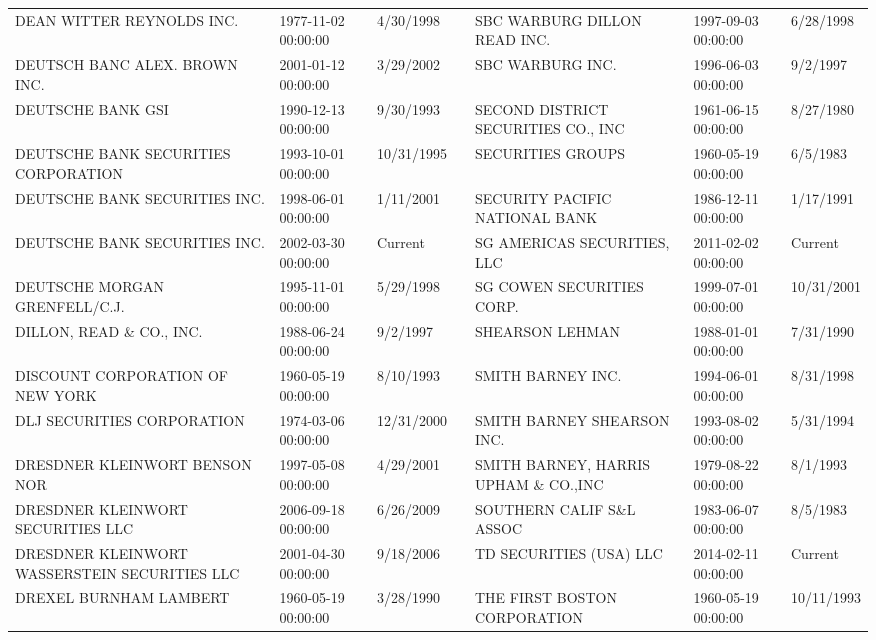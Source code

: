 \begin{tabular}{lllllll}
DEAN WITTER REYNOLDS INC.           & 1977-11-02 00:00:00 & 4/30/1998 &  & SBC WARBURG DILLON READ INC.    & 1997-09-03 00:00:00 & 6/28/1998 \\
DEUTSCH BANC ALEX. BROWN INC.        & 2001-01-12 00:00:00 & 3/29/2002 &  & SBC WARBURG INC.                & 1996-06-03 00:00:00 & 9/2/1997 \\
DEUTSCHE BANK GSI                    & 1990-12-13 00:00:00 & 9/30/1993 &  & SECOND DISTRICT SECURITIES CO., INC  & 1961-06-15 00:00:00 & 8/27/1980 \\
DEUTSCHE BANK SECURITIES CORPORATION & 1993-10-01 00:00:00 & 10/31/1995 &  & SECURITIES GROUPS                    & 1960-05-19 00:00:00 & 6/5/1983 \\
DEUTSCHE BANK SECURITIES INC.        & 1998-06-01 00:00:00 & 1/11/2001 &  & SECURITY PACIFIC NATIONAL BANK       & 1986-12-11 00:00:00 & 1/17/1991 \\
DEUTSCHE BANK SECURITIES INC.        & 2002-03-30 00:00:00 & Current &  & SG AMERICAS SECURITIES, LLC & 2011-02-02 00:00:00 & Current \\
DEUTSCHE MORGAN GRENFELL/C.J.        & 1995-11-01 00:00:00 & 5/29/1998 &  & SG COWEN SECURITIES CORP.           & 1999-07-01 00:00:00 & 10/31/2001 \\
DILLON, READ \& CO., INC.            & 1988-06-24 00:00:00 & 9/2/1997 &  & SHEARSON LEHMAN                      & 1988-01-01 00:00:00 & 7/31/1990 \\
DISCOUNT CORPORATION OF NEW YORK     & 1960-05-19 00:00:00 & 8/10/1993 &  & SMITH BARNEY INC.                    & 1994-06-01 00:00:00 & 8/31/1998 \\
DLJ SECURITIES CORPORATION          & 1974-03-06 00:00:00 & 12/31/2000 &  & SMITH BARNEY SHEARSON INC.           & 1993-08-02 00:00:00 & 5/31/1994 \\
DRESDNER KLEINWORT BENSON NOR   & 1997-05-08 00:00:00 & 4/29/2001 &  & SMITH BARNEY, HARRIS UPHAM \& CO.,INC & 1979-08-22 00:00:00 & 8/1/1993 \\
DRESDNER KLEINWORT SECURITIES LLC & 2006-09-18 00:00:00 & 6/26/2009 &  & SOUTHERN CALIF S\&L ASSOC            & 1983-06-07 00:00:00 & 8/5/1983 \\
DRESDNER KLEINWORT WASSERSTEIN SECURITIES LLC & 2001-04-30 00:00:00 & 9/18/2006 &  & TD SECURITIES (USA) LLC & 2014-02-11 00:00:00 & Current \\
DREXEL BURNHAM LAMBERT              & 1960-05-19 00:00:00 & 3/28/1990 &  & THE FIRST BOSTON CORPORATION        & 1960-05-19 00:00:00 & 10/11/1993 \\

\end{tabular}
